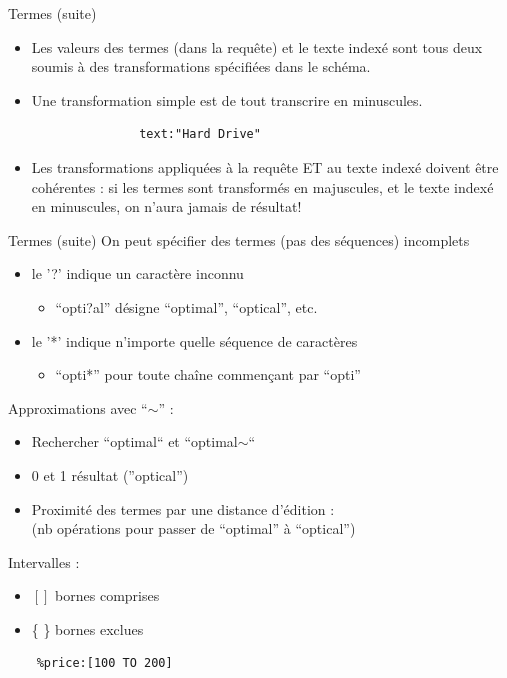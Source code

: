 \begin{frame}[fragile]{Termes (suite)}


  \begin{itemize}
    \item Les valeurs des termes (dans la requête) et le texte indexé sont tous deux
soumis à des transformations spécifiées dans le schéma. 
\item Une transformation simple est de tout transcrire en minuscules. 
\begin{verbatim}
               text:"Hard Drive"
\end{verbatim}
\item  Les transformations appliquées à la requête ET au texte indexé doivent être 
   cohérentes : si les termes sont transformés en majuscules, et le texte indexé en minuscules,
   on n'aura jamais de résultat!
  \end{itemize}
\end{frame}

\begin{frame}[fragile]{Termes (suite)}
  On peut spécifier des termes (pas des séquences) incomplets
  \begin{itemize}
    \item le '?' indique un caractère inconnu
      \begin{itemize}
        \item ``opti?al'' désigne ``optimal'', ``optical'', etc.
      \end{itemize}
    \item le '*' indique n'importe quelle séquence de caractères
      \begin{itemize}
        \item ``opti*'' pour toute chaîne commençant par ``opti''
      \end{itemize}
  \end{itemize}

  Approximations avec ``$\sim$'' :
  \begin{itemize}
    \item Rechercher ``optimal`` et ``optimal$\sim$``
    \item 0 et 1 résultat (''optical'')
    \item Proximité des termes par une distance d'édition : \\
      (nb opérations pour passer de ``optimal'' à ``optical'')
  \end{itemize}
  Intervalles :\\
  \begin{itemize}
    \item $[ ]$ bornes comprises
    \item \{ \} bornes exclues
  \end{itemize}
\begin{verbatim}
    %price:[100 TO 200]
\end{verbatim}
\end{frame}

